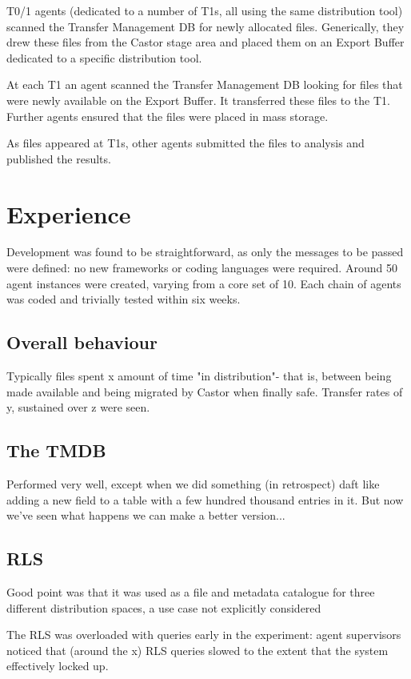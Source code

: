 \documentclass{cmspaper}
\begin{document}
T0/1 agents (dedicated to a number of T1s, all using the same distribution 
tool) scanned the Transfer Management DB for newly allocated files. 
Generically, they drew these files from the Castor stage area and placed 
them on an Export Buffer dedicated to a specific distribution tool.

At each T1 an agent scanned the Transfer Management DB looking for 
files that were newly available on the Export Buffer. It transferred these 
files to the T1. Further agents ensured that the files were placed in 
mass storage.

As files appeared at T1s, other agents submitted the files to analysis
and published the results.

\section{Experience}
Development was found to be straightforward, as only the messages to be passed
were defined: no new frameworks or coding languages were required. Around 50
agent instances were created, varying from a core set of 10. Each chain of
agents was coded and trivially tested within six weeks.

\subsection{Overall behaviour}
Typically files spent x amount of time "in distribution"- that is, between
being made available and being migrated by Castor when finally safe. Transfer 
rates of y, sustained over z were seen.

\subsection{The TMDB}
Performed very well, except when we did something (in retrospect) daft like
adding a new field to a table with a few hundred thousand entries in it. But
now we've seen what happens we can make a better version...

\subsection{RLS}
Good point was that it was used as a file and metadata catalogue for three
different distribution spaces, a use case not explicitly considered

The RLS was overloaded with queries early in the experiment: agent supervisors
noticed that (around the x) RLS queries slowed to the extent that the system
effectively locked up.
\end{document}
